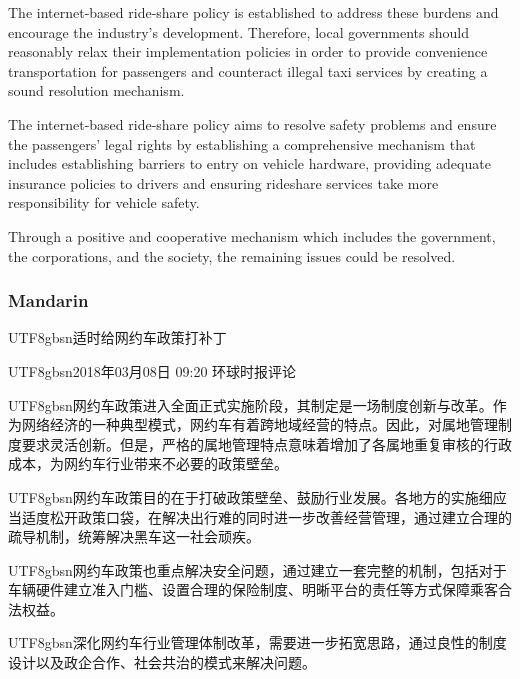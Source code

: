 \documentclass[11pt]{article}
\newcommand{\zh}[1]{\begin{CJK*}{UTF8}{gbsn}#1\end{CJK*}}
\begin{document}
The internet-based ride-share policy is established to address these burdens and encourage the industry’s development. Therefore, local governments should reasonably relax their implementation policies in order to provide convenience transportation for passengers and counteract illegal taxi services by creating a sound resolution mechanism.

The internet-based ride-share policy aims to resolve safety problems and ensure the passengers’ legal rights by establishing a comprehensive mechanism that includes establishing barriers to entry on vehicle hardware, providing adequate insurance policies to drivers and ensuring rideshare services take more responsibility for vehicle safety.

Through a positive and cooperative mechanism which includes the government, the corporations, and the society, the remaining issues could be resolved.

\subsubsection{Mandarin}

\begin{minipage}{\linewidth}

\zh{适时给网约车政策打补丁}\newline

\noindent\zh{2018年03月08日 09:20 环球时报评论}\newline

\zh{网约车政策进入全面正式实施阶段，其制定是一场制度创新与改革。作为网络经济的一种典型模式，网约车有着跨地域经营的特点。因此，对属地管理制度要求灵活创新。但是，严格的属地管理特点意味着增加了各属地重复审核的行政成本，为网约车行业带来不必要的政策壁垒。}

\zh{网约车政策目的在于打破政策壁垒、鼓励行业发展。各地方的实施细应当适度松开政策口袋，在解决出行难的同时进一步改善经营管理，通过建立合理的疏导机制，统筹解决黑车这一社会顽疾。}

\zh{网约车政策也重点解决安全问题，通过建立一套完整的机制，包括对于车辆硬件建立准入门槛、设置合理的保险制度、明晰平台的责任等方式保障乘客合法权益。}

\zh{深化网约车行业管理体制改革，需要进一步拓宽思路，通过良性的制度设计以及政企合作、社会共治的模式来解决问题。}

\end{minipage}
\end{document}
